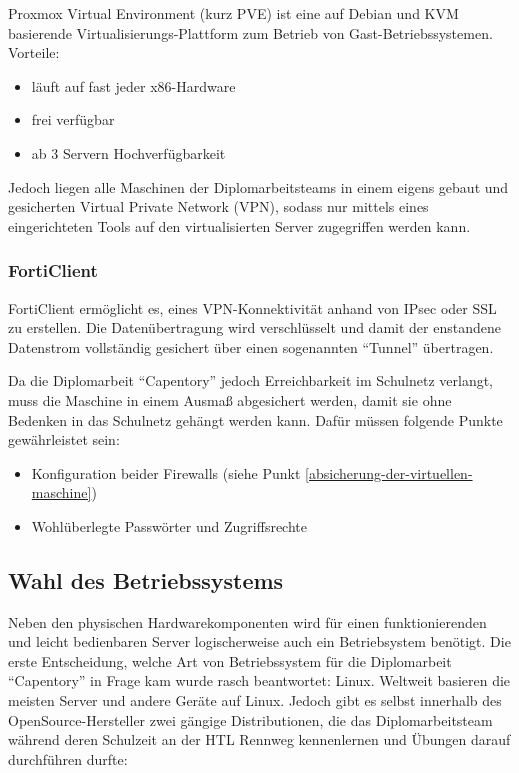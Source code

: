 Proxmox Virtual Environment (kurz PVE) ist eine auf Debian und KVM
basierende Virtualisierungs-Plattform zum Betrieb von
Gast-Betriebssystemen. Vorteile:

\begin{itemize}
\tightlist
\item
  läuft auf fast jeder x86-Hardware
\item
  frei verfügbar
\item
  ab 3 Servern Hochverfügbarkeit
\end{itemize}

Jedoch liegen alle Maschinen der Diplomarbeitsteams in einem eigens
gebaut und gesicherten Virtual Private Network (VPN), sodass nur mittels
eines eingerichteten Tools auf den virtualisierten Server zugegriffen
werden kann.

\hypertarget{forticlient}{%
\subsubsection{FortiClient}\label{forticlient}}

FortiClient ermöglicht es, eines VPN-Konnektivität anhand von IPsec oder
SSL zu erstellen. Die Datenübertragung wird verschlüsselt und damit der
enstandene Datenstrom vollständig gesichert über einen sogenannten
``Tunnel'' übertragen.

Da die Diplomarbeit ``Capentory'' jedoch Erreichbarkeit im Schulnetz
verlangt, muss die Maschine in einem Ausmaß abgesichert werden, damit
sie ohne Bedenken in das Schulnetz gehängt werden kann. Dafür müssen
folgende Punkte gewährleistet sein:

\begin{itemize}
\tightlist
\item
  Konfiguration beider Firewalls (siehe Punkt
  \ref{absicherung-der-virtuellen-maschine})
\item
  Wohlüberlegte Passwörter und Zugriffsrechte
\end{itemize}

\hypertarget{wahl-des-betriebssystems}{%
\subsection{Wahl des Betriebssystems}\label{wahl-des-betriebssystems}}

Neben den physischen Hardwarekomponenten wird für einen funktionierenden
und leicht bedienbaren Server logischerweise auch ein Betriebsystem
benötigt. Die erste Entscheidung, welche Art von Betriebssystem für die
Diplomarbeit ``Capentory'' in Frage kam wurde rasch beantwortet: Linux.
Weltweit basieren die meisten Server und andere Geräte auf Linux. Jedoch
gibt es selbst innerhalb des OpenSource-Hersteller zwei gängige
Distributionen, die das Diplomarbeitsteam während deren Schulzeit an der
HTL Rennweg kennenlernen und Übungen darauf durchführen durfte:

